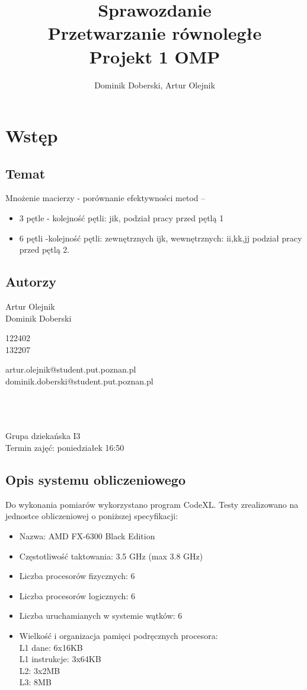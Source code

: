 \documentclass{article}
\author{Dominik Doberski, Artur Olejnik}
\title{\huge Sprawozdanie \\ Przetwarzanie równoległe\\ \Huge Projekt 1 OMP
}
\begin{document}
\maketitle

\section{Wstęp}
\subsection{Temat}
Mnożenie macierzy - porównanie efektywności metod --
\begin{itemize}
\item 3 pętle - kolejność pętli: jik, podział pracy przed pętlą 1
\item 6 pętli -kolejność pętli: zewnętrznych ijk, wewnętrznych: ii,kk,jj podział pracy przed pętlą 2.
\end{itemize}
\subsection{Autorzy}
\begin{minipage}[t]{0.3\textwidth}
Artur Olejnik\\
Dominik Doberski
\end{minipage}
\begin{minipage}[t]{0.15\textwidth}
122402\\
132207
\end{minipage}
\begin{minipage}[t]{0.55\textwidth}
artur.olejnik@student.put.poznan.pl\\
dominik.doberski@student.put.poznan.pl
\end{minipage}
\\\\\\
Grupa dziekańska I3\\
Termin zajęć: poniedziałek 16:50 
\subsection{Opis systemu obliczeniowego}
Do wykonania pomiarów wykorzystano program CodeXL. Testy zrealizowano na jednostce obliczeniowej o poniższej specyfikacji:
\begin{itemize}
\item Nazwa: AMD FX-6300 Black Edition
\item Częstotliwość taktowania: 3.5 GHz (max 3.8 GHz)
\item Liczba procesorów fizycznych: 6
\item Liczba procesorów logicznych: 6
\item Liczba uruchamianych w systemie wątków: 6
\item Wielkość i organizacja pamięci podręcznych procesora:\\
L1 dane: 6x16KB\\
L1 instrukcje: 3x64KB\\
L2: 3x2MB\\
L3: 8MB\\
\end{itemize}
\end{document}
